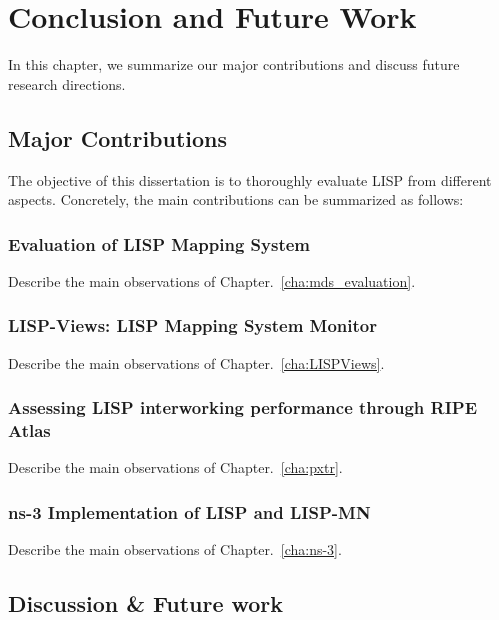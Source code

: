 
\chapter{Conclusion and Future Work}
\label{cha:conclusion}
In this chapter, we summarize our major contributions and discuss future research directions.

\section{Major Contributions}
The objective of this dissertation is to thoroughly evaluate LISP from different aspects. Concretely, the main contributions can be summarized as follows:

\subsection{Evaluation of LISP Mapping System}
Describe the main observations of Chapter.~\ref{cha:mds_evaluation}.

\subsection{LISP-Views: LISP Mapping System Monitor}
Describe the main observations of Chapter.~\ref{cha:LISPViews}.

\subsection{Assessing LISP interworking performance through RIPE Atlas}
Describe the main observations of Chapter.~\ref{cha:pxtr}.

\subsection{ns-3 Implementation of LISP and LISP-MN}
Describe the main observations of Chapter.~\ref{cha:ns-3}.



\section{Discussion \& Future work}

